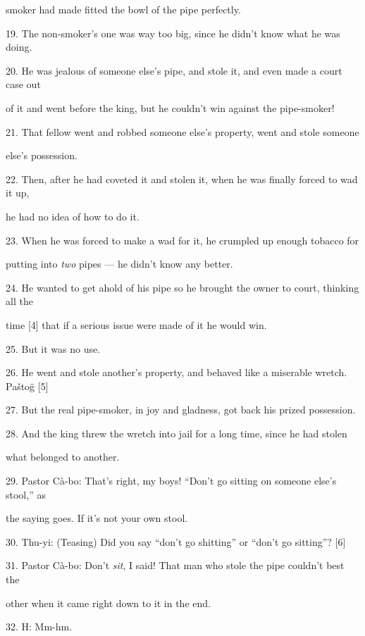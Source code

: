 {\Large{}smoker had made fitted the bowl of the pipe perfectly.}

{\Large{}19. The non-smoker's one was way too big, since he didn't know what he
was doing.}

{\Large{}20. He was jealous of someone else's pipe, and stole it, and even made
a court case out       }

{\Large{}of it and went before the king, but he couldn't win against the pipe-smoker!}

{\Large{}21. That fellow went and robbed someone else's property, went and stole
someone       }

{\Large{}else's possession.}

{\Large{}22. Then, after he had coveted it and stolen it, when he was finally forced
to wad it up,        }

{\Large{}he had no idea of how to do it.}

{\Large{}23. When he was forced to make a wad for it, he crumpled up enough tobacco
for       }

{\Large{}putting into }{\Large{}\textit{two }}{\Large{}pipes --- he didn't know
any better.}

{\Large{}24. He wanted to get ahold of his pipe so he brought the owner to court,
thinking all the       }

{\Large{}time [4] that if a serious issue were made of it he would win.}

{\Large{}25. But it was no use.}

{\Large{}26. He went and stole another's property, and behaved like a miserable
wretch. Paštog̈ [5]}

{\Large{}27. But the real pipe-smoker, in joy and gladness, got back his prized
possession.}

{\Large{}28. And the king threw the wretch into jail for a long time, since he
had stolen       }

{\Large{}what belonged to another.}

{\Large{}29. Pastor Cà-bo: That's right, my boys! ``Don't go sitting on someone
else's stool,'' as       }

{\Large{}the saying goes.  If it's not your own stool.}

{\Large{}30. Thu-yi: (Teasing) Did you say ``don't go shitting'' or ``don't go
sitting''? [6]}

{\Large{}31. Pastor Cà-bo: Don't }{\Large{}\textit{sit}}{\Large{}, I said! That
man who stole the pipe couldn't best the       }

{\Large{}other when it came right down to it in the end.}

{\Large{}32. H: Mm-hm.}

